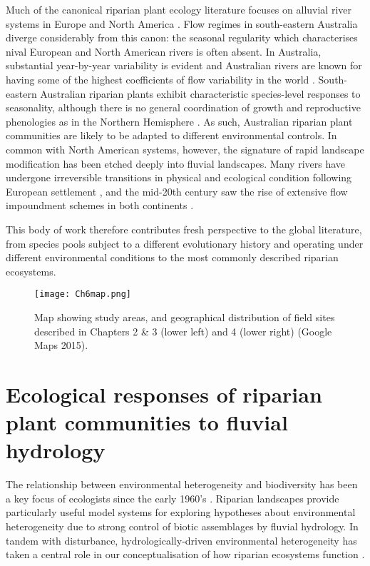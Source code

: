 \documentclass[openright,12pt,a4paper]{memoir}
\begin{document}
Much of the canonical riparian plant ecology literature focuses on alluvial river systems in Europe and North America \citep{Nilsson1989, Naiman1997, Tabacchi1998, Naiman2005, Corenblit2007}. Flow regimes in south-eastern Australia diverge considerably from this canon: the seasonal regularity which characterises nival European and North American rivers is often absent. In Australia, substantial year-by-year variability is evident and Australian rivers are known for having some of the highest coefficients of flow variability in the world \citep{Peel2004, Rustomji2009}. South-eastern Australian riparian plants exhibit characteristic species-level responses to seasonality, although there is no general coordination of growth and reproductive phenologies as in the Northern Hemisphere \citep{Ford1979}. As such, Australian riparian plant communities are likely to be adapted to different environmental controls. In common with North American systems, however, the signature of rapid landscape modification has been etched deeply into fluvial landscapes. Many rivers have undergone irreversible transitions in physical and ecological condition following European settlement \citep{Knopf1988, Fleischner1994, Wasson1994, Brierley1999}, and the mid-20th century saw the rise of extensive flow impoundment schemes in both continents \citep{Lloyd2004, Graf2006}.

This body of work therefore contributes fresh perspective to the global literature, from species pools subject to a different evolutionary history and operating under different environmental conditions to the most commonly described riparian ecosystems.

\begin{figure}[ht]
\begin{center}
\texttt{[image: Ch6map.png]} %
\caption[Map of study areas described in Chapters 2 and 3.]{\small{Map showing study areas, and geographical distribution of field sites described in Chapters 2 \& 3 (lower left) and 4 (lower right) (Google Maps 2015).}\label{fig:Ch6_F1}}
\end{center}
\end{figure}   
\clearpage

\section{Ecological responses of riparian plant communities to fluvial hydrology}
The relationship between environmental heterogeneity and biodiversity has been a key focus of ecologists since the early 1960’s \citep{MacArthur1961, Stein2014}. Riparian landscapes provide particularly useful model systems for exploring hypotheses about environmental heterogeneity due to strong control of biotic assemblages by fluvial hydrology. In tandem with disturbance, hydrologically-driven environmental heterogeneity has taken a central role in our conceptualisation of how riparian ecosystems function \citep{Poff1997, Naiman2005}.
\end{document}
